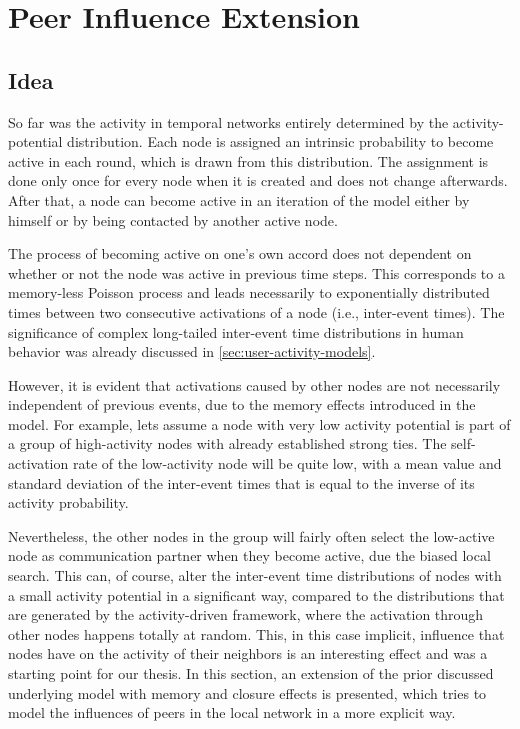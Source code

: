 

\section{Peer Influence Extension}
\label{sec:peer-influence-model}


\subsection{Idea}

So far was the activity in temporal networks entirely determined by the activity-potential distribution.
Each node is assigned an intrinsic probability to become active in each round, which is drawn from this distribution.
The assignment is done only once for every node when it is created and does not change afterwards.
After that, a node can become active in an iteration of the model either by himself or by being contacted by another active node.

The process of becoming active on one's own accord does not dependent on whether or not the node was active in previous time steps.
This corresponds to a memory-less Poisson process and leads necessarily to exponentially distributed times between two consecutive activations of a node (i.e., inter-event times).
The significance of complex long-tailed inter-event time distributions in human behavior was already discussed in \cref{sec:user-activity-models}.

However, it is evident that activations caused by other nodes are not necessarily independent of previous events, due to the memory effects introduced in the model.
For example, lets assume a node with very low activity potential is part of a group of high-activity nodes with already established strong ties.
The self-activation rate of the low-activity node will be quite low, with a mean value and standard deviation of the inter-event times that is equal to the inverse of its activity probability.

Nevertheless, the other nodes in the group will fairly often select the low-active node as communication partner when they become active, due the biased local search.
This can, of course, alter the inter-event time distributions of nodes with a small activity potential in a significant way, compared to the distributions that are generated by the activity-driven framework, where the activation through other nodes happens totally at random.
This, in this case implicit, influence that nodes have on the activity of their neighbors is an interesting effect and was a starting point for our thesis.
In this section, an extension of the prior discussed underlying model with memory and closure effects is presented, which tries to model the influences of peers in the local network in a more explicit way.

